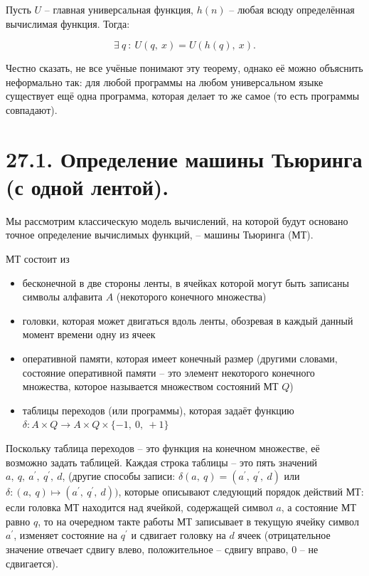 \begin{point}
	Пусть $U$ -- главная универсальная функция, $h(n)$ -- любая всюду определённая вычислимая функция. Тогда:
	
	\[
	\exists\ q \ : \ U(q,\ x) = U(h(q),\ x).
	\]
\end{point}

Честно сказать, не все учёные понимают эту теорему, однако её можно объяснить неформально
так: для любой программы на любом универсальном языке существует ещё одна программа,
которая делает то же самое (то есть программы совпадают).

\section*{27.1. Определение машины Тьюринга (с одной лентой).}

Мы рассмотрим классическую модель вычислений, на которой будут основано точное определение вычислимых функций, -- машины Тьюринга (МТ).

МТ состоит из

\begin{itemize}
	\item бесконечной в две стороны ленты, в ячейках которой могут быть записаны символы алфавита $A$ (некоторого конечного множества)
	\item головки, которая может двигаться вдоль ленты, обозревая в каждый данный момент времени одну из ячеек
	\item оперативной памяти, которая имеет конечный размер (другими словами, состояние оперативной памяти -- это элемент некоторого конечного множества, которое называется множеством состояний МТ $Q$)
	\item таблицы переходов (или программы), которая задаёт функцию $\delta : A \times Q \to A \times Q \times \{-1,\ 0,\ +1\}$
\end{itemize}

Поскольку таблица переходов -- это функция на конечном множестве, её возможно задать таблицей. Каждая строка таблицы -- это пять значений $a,\ q,\ a^{'},\ q^{'},\ d$, (другие способы записи: $\delta(a,\ q) = (a^{'},\ q^{'},\ d)$ или $\delta : (a,\ q) \mapsto (a^{'},\ q^{'},\ d))$, которые описывают следующий порядок действий МТ: если головка МТ находится над ячейкой, содержащей символ $a$, а состояние МТ равно $q$, то на очередном такте
работы МТ записывает в текущую ячейку символ $a^{'}$, изменяет состояние на $q^{'}$ и сдвигает головку на $d$ ячеек (отрицательное значение отвечает сдвигу влево, положительное -- сдвигу вправо, $0$ -- не сдвигается).

